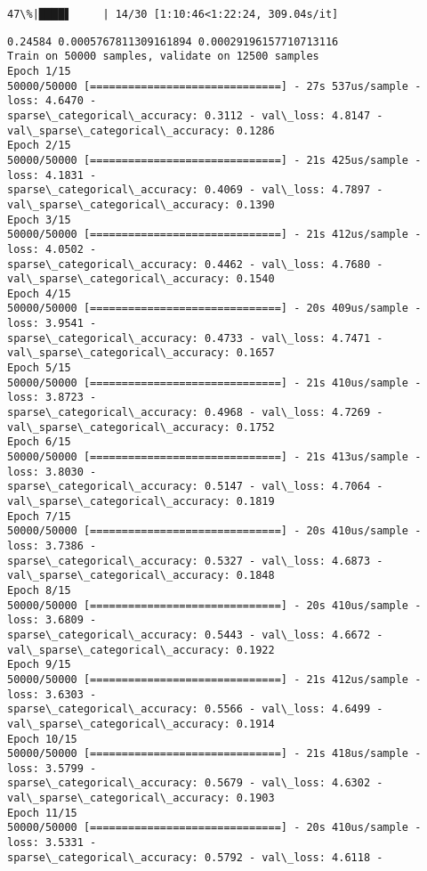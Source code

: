 \documentclass[11pt]{article}
\begin{document}
    \begin{Verbatim}[commandchars=\\\{\}]
 47\%|████▋     | 14/30 [1:10:46<1:22:24, 309.04s/it]
    \end{Verbatim}

    \begin{Verbatim}[commandchars=\\\{\}]
0.24584 0.0005767811309161894 0.00029196157710713116
Train on 50000 samples, validate on 12500 samples
Epoch 1/15
50000/50000 [==============================] - 27s 537us/sample - loss: 4.6470 -
sparse\_categorical\_accuracy: 0.3112 - val\_loss: 4.8147 -
val\_sparse\_categorical\_accuracy: 0.1286
Epoch 2/15
50000/50000 [==============================] - 21s 425us/sample - loss: 4.1831 -
sparse\_categorical\_accuracy: 0.4069 - val\_loss: 4.7897 -
val\_sparse\_categorical\_accuracy: 0.1390
Epoch 3/15
50000/50000 [==============================] - 21s 412us/sample - loss: 4.0502 -
sparse\_categorical\_accuracy: 0.4462 - val\_loss: 4.7680 -
val\_sparse\_categorical\_accuracy: 0.1540
Epoch 4/15
50000/50000 [==============================] - 20s 409us/sample - loss: 3.9541 -
sparse\_categorical\_accuracy: 0.4733 - val\_loss: 4.7471 -
val\_sparse\_categorical\_accuracy: 0.1657
Epoch 5/15
50000/50000 [==============================] - 21s 410us/sample - loss: 3.8723 -
sparse\_categorical\_accuracy: 0.4968 - val\_loss: 4.7269 -
val\_sparse\_categorical\_accuracy: 0.1752
Epoch 6/15
50000/50000 [==============================] - 21s 413us/sample - loss: 3.8030 -
sparse\_categorical\_accuracy: 0.5147 - val\_loss: 4.7064 -
val\_sparse\_categorical\_accuracy: 0.1819
Epoch 7/15
50000/50000 [==============================] - 20s 410us/sample - loss: 3.7386 -
sparse\_categorical\_accuracy: 0.5327 - val\_loss: 4.6873 -
val\_sparse\_categorical\_accuracy: 0.1848
Epoch 8/15
50000/50000 [==============================] - 20s 410us/sample - loss: 3.6809 -
sparse\_categorical\_accuracy: 0.5443 - val\_loss: 4.6672 -
val\_sparse\_categorical\_accuracy: 0.1922
Epoch 9/15
50000/50000 [==============================] - 21s 412us/sample - loss: 3.6303 -
sparse\_categorical\_accuracy: 0.5566 - val\_loss: 4.6499 -
val\_sparse\_categorical\_accuracy: 0.1914
Epoch 10/15
50000/50000 [==============================] - 21s 418us/sample - loss: 3.5799 -
sparse\_categorical\_accuracy: 0.5679 - val\_loss: 4.6302 -
val\_sparse\_categorical\_accuracy: 0.1903
Epoch 11/15
50000/50000 [==============================] - 20s 410us/sample - loss: 3.5331 -
sparse\_categorical\_accuracy: 0.5792 - val\_loss: 4.6118 -

\end{Verbatim}
\end{document}
